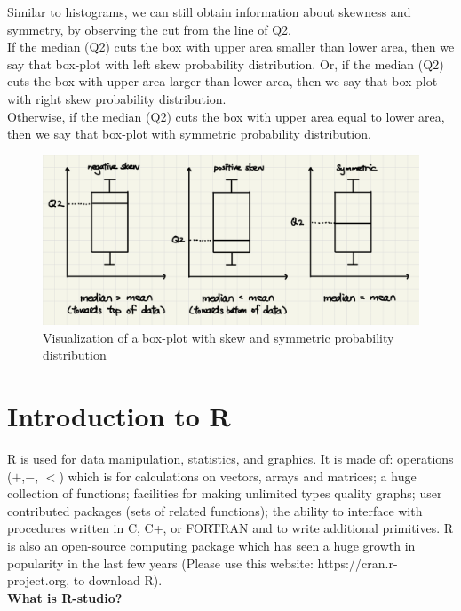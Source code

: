 \noindent
Similar to histograms, we can still obtain information about skewness and symmetry, by observing the cut from the line of Q2.\\

\noindent
If the median (Q2) cuts the box with upper area smaller than lower area, then we say that box-plot with left skew probability distribution. Or, if the median (Q2) cuts the box with upper area larger than lower area, then we say that box-plot with right skew probability distribution.\\

\noindent
Otherwise, if the median (Q2) cuts the box with upper area equal to lower area, then we say that box-plot with symmetric probability distribution.

\begin{figure}[H]
 \centering
 \includegraphics[scale=0.15]{Section1/img/Bskew.jpg}
 \caption{Visualization of a box-plot with skew and symmetric probability distribution}
\end{figure}

\section{Introduction to R}

R is used for data manipulation, statistics, and graphics. It is made of: operations ($+$,$ -$, $<$) which is for calculations on vectors, arrays and matrices; a huge collection of functions; facilities for making unlimited types quality graphs; user contributed packages (sets of related functions); the ability to interface with procedures written in C, C+, or FORTRAN and to write additional primitives. R is also an open-source computing package which has seen a huge growth in popularity in the last few years (Please use this website: https://cran.r-project.org, to download R).\\

\noindent
\textbf{What is R-studio?}

